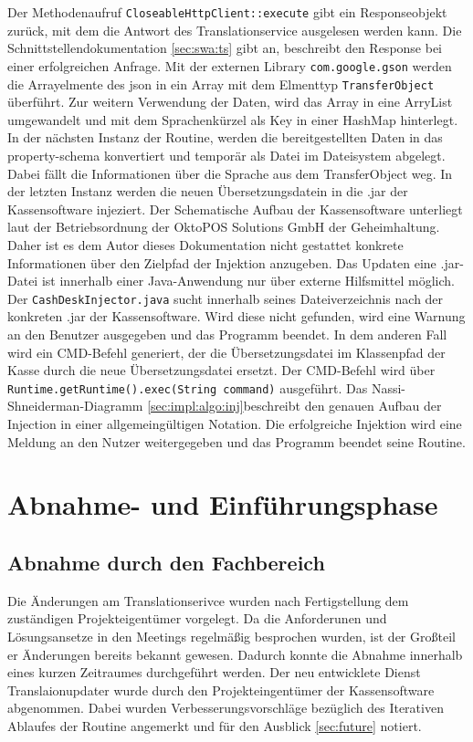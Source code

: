 \documentclass[10pt, oneside]{article}
\begin{document}
    Der Methodenaufruf \lstinline{CloseableHttpClient::execute} gibt ein Responseobjekt zurück, mit dem die Antwort des Translationservice ausgelesen werden kann.
    Die Schnittstellendokumentation \ref{sec:swa:ts} gibt an, beschreibt den Response bei einer erfolgreichen Anfrage. Mit der externen Library \lstinline{com.google.gson} werden die Arrayelmente des
    json in ein Array mit dem Elmenttyp \lstinline{TransferObject} überführt. Zur weitern Verwendung der Daten, wird das Array in eine ArryList umgewandelt und mit dem Sprachenkürzel als Key in einer HashMap hinterlegt.\\
    In der nächsten Instanz der Routine, werden die bereitgestellten Daten in das property-schema konvertiert und temporär als Datei im Dateisystem abgelegt. 
    Dabei fällt die Informationen über die Sprache aus dem TransferObject weg. 
    In der letzten Instanz werden die neuen Übersetzungsdatein in die .jar der Kassensoftware injeziert. Der Schematische Aufbau der Kassensoftware unterliegt laut der Betriebsordnung der OktoPOS Solutions GmbH
    der Geheimhaltung. Daher ist es dem Autor dieses Dokumentation nicht gestattet konkrete Informationen über den Zielpfad der Injektion anzugeben. 
    Das Updaten eine .jar-Datei ist innerhalb einer Java-Anwendung nur über externe Hilfsmittel möglich. 
    Der \lstinline{CashDeskInjector.java} sucht innerhalb seines Dateiverzeichnis nach der konkreten .jar der Kassensoftware. Wird diese nicht gefunden, wird eine Warnung an den 
    Benutzer ausgegeben und das Programm beendet. In dem anderen Fall wird ein CMD-Befehl generiert, der die Übersetzungsdatei im Klassenpfad der Kasse durch die neue Übersetzungsdatei ersetzt. 
    Der CMD-Befehl wird über \lstinline{Runtime.getRuntime().exec(String command)} ausgeführt. Das Nassi-Shneiderman-Diagramm \ref{sec:impl:algo:inj}beschreibt den genauen Aufbau der Injection in einer allgemeingültigen Notation.
    Die erfolgreiche Injektion wird eine Meldung an den Nutzer weitergegeben und das Programm beendet seine Routine.
  \section{Abnahme- und Einführungsphase}
  \subsection{Abnahme durch den Fachbereich}
    Die Änderungen am Translationserivce wurden nach Fertigstellung dem zuständigen Projekteigentümer vorgelegt. Da die Anforderunen und Lösungsansetze in den Meetings 
    regelmäßig besprochen wurden, ist der Großteil er Änderungen bereits bekannt gewesen. Dadurch konnte die Abnahme innerhalb eines kurzen Zeitraumes durchgeführt werden.
    Der neu entwicklete Dienst Translaionupdater wurde durch den Projekteingentümer der Kassensoftware abgenommen. Dabei wurden Verbesserungsvorschläge bezüglich des Iterativen Ablaufes
    der Routine angemerkt und für den Ausblick \ref{sec:future} notiert. 
\end{document}
